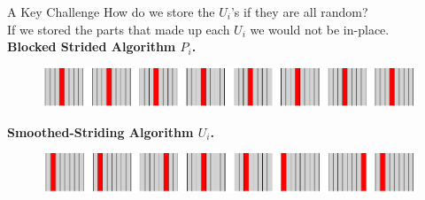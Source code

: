\documentclass[xcolor=x11names, svgnames, rgb]{beamer}
\begin{document}

\begin{frame}[t]{A Key Challenge}
How do we store the $U_i$'s if they are all random?	\\
\vspace{0.5cm}
If we stored the parts that made up each $U_i$ we would not be in-place.\\
\vspace{0.5cm}
\textbf{Blocked Strided Algorithm $P_i$.}
\begin{figure}
	\includegraphics[width=\linewidth]{imgs/stridedAlgHighlighted.png}
\end{figure}
\textbf{Smoothed-Striding Algorithm $U_i$.}
\begin{figure}
	\includegraphics[width=\linewidth]{imgs/smoothedStridingAlgHighlighted.png}
\end{figure}
\end{frame}
\end{document}
